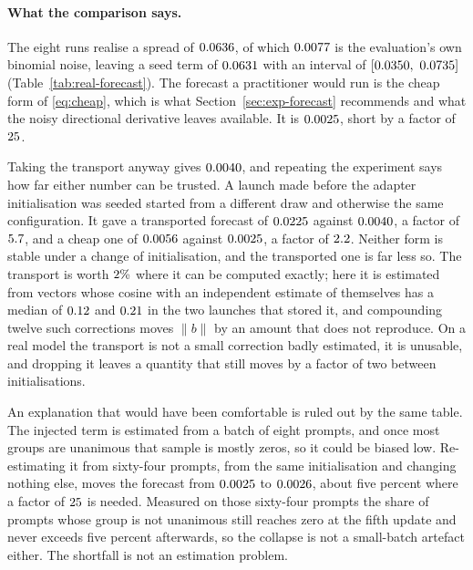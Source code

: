 \paragraph{What the comparison says.} The eight runs realise a spread of $0.0636$, of which
$0.0077$ is the evaluation's own binomial noise, leaving a seed term of $0.0631$ with an interval of
$[0.0350,\ 0.0735]$ (Table~\ref{tab:real-forecast}). The forecast a practitioner would run is the
cheap form of \eqref{eq:cheap}, which is what Section~\ref{sec:exp-forecast} recommends and what
the noisy directional derivative leaves available. It is $0.0025$, short by a factor of $25$.

Taking the transport anyway gives $0.0040$, and repeating the experiment says how far either
number can be trusted. A launch made before the adapter initialisation was seeded started from
a different draw and otherwise the same configuration. It gave a transported forecast of
$0.0225$ against $0.0040$, a factor of
$5.7$, and a cheap one of $0.0056$ against
$0.0025$, a factor of $2.2$. Neither form is stable under a change of initialisation, and the transported
one is far less so. The transport is worth $2\%$ where it can be computed exactly; here it is
estimated from vectors whose cosine with an independent estimate of themselves has a median of $0.12$
and $0.21$ in the two launches that stored it, and compounding twelve such corrections moves $\|b\|$ by an amount that does not
reproduce. On a real model the transport is not a small correction badly estimated, it is unusable,
and dropping it leaves a quantity that still moves by a factor of two between initialisations.

An explanation that would have been comfortable is ruled out by the same table. The injected term
is estimated from a batch of eight prompts, and once most groups are unanimous that sample is
mostly zeros, so it could be biased low. Re-estimating it from sixty-four prompts, from the same
initialisation and changing nothing else, moves the forecast from $0.0025$ to $0.0026$, about five
percent where a factor of $25$ is needed. Measured on those sixty-four prompts the share of
prompts whose group is not unanimous still reaches zero at the fifth update and never exceeds five
percent afterwards, so the collapse is not a small-batch artefact either. The shortfall is not an
estimation problem.

